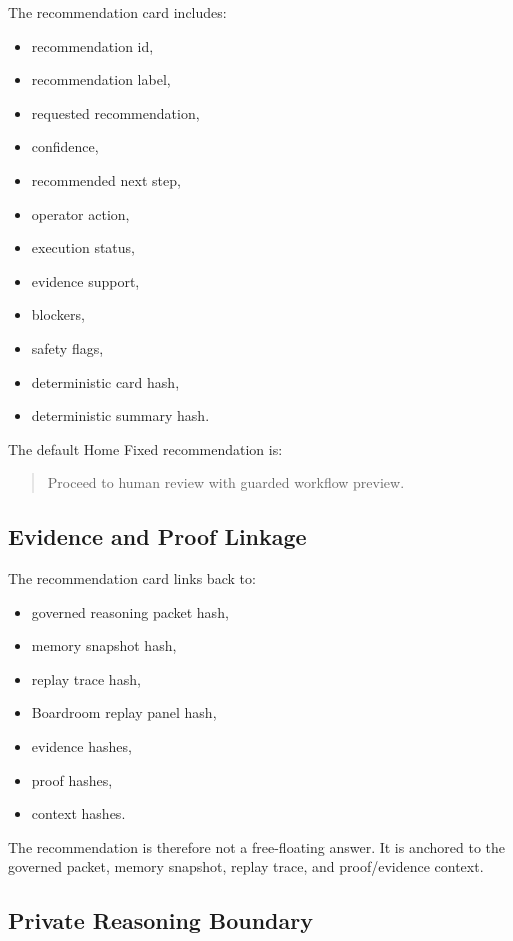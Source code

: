 The recommendation card includes:

\begin{itemize}
  \item recommendation id,
  \item recommendation label,
  \item requested recommendation,
  \item confidence,
  \item recommended next step,
  \item operator action,
  \item execution status,
  \item evidence support,
  \item blockers,
  \item safety flags,
  \item deterministic card hash,
  \item deterministic summary hash.
\end{itemize}

The default Home Fixed recommendation is:

\begin{quote}
Proceed to human review with guarded workflow preview.
\end{quote}

\subsection{Evidence and Proof Linkage}

The recommendation card links back to:

\begin{itemize}
  \item governed reasoning packet hash,
  \item memory snapshot hash,
  \item replay trace hash,
  \item Boardroom replay panel hash,
  \item evidence hashes,
  \item proof hashes,
  \item context hashes.
\end{itemize}

The recommendation is therefore not a free-floating answer. It is anchored to the governed packet, memory snapshot, replay trace, and proof/evidence context.

\subsection{Private Reasoning Boundary}


